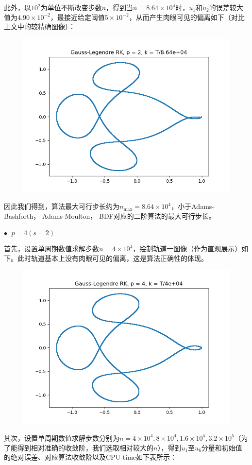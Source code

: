 \documentclass{ctexart}
\begin{document}
\begin{sloppypar}
此外，以$10^2$为单位不断改变步数$n$，得到当$n = 8.64 \times 10^4$时，$u_1$和$u_2$的误差较大值为$4.90 \times 10^{-2}$，最接近给定阈值$5 \times 10^{-2}$，从而产生肉眼可见的偏离如下（对比上文中的较精确图像）：
\begin{figure}[H]
\centering
\includegraphics[scale = 0.45]{./report_src/Figure_30.png}
\end{figure}
因此我们得到，算法最大可行步长约为$n_{\max} = 8.64 \times 10^4$，小于Adams-Bashforth， Adams-Moulton， BDF对应的二阶算法的最大可行步长。

$\bullet \;$ $p = 4(s=2)$

首先，设置单周期数值求解步数$n = 4 \times 10^4$，绘制轨道一图像（作为直观展示）如下。此时轨道基本上没有肉眼可见的偏离，这是算法正确性的体现。
\begin{figure}[H]
\centering
\includegraphics[scale = 0.45]{./report_src/Figure_31.png}
\end{figure}
其次，设置单周期数值求解步数分别为$n = 4 \times 10^4,8 \times 10^4,1.6 \times 10^5, 3.2 \times 10^5$（为了能得到相对准确的收敛阶，我们选取相对较大的$n$），得到$u_1$至$u_6$分量和初始值的绝对误差、对应算法收敛阶以及CPU time如下表所示：


\end{sloppypar}
\end{document}
